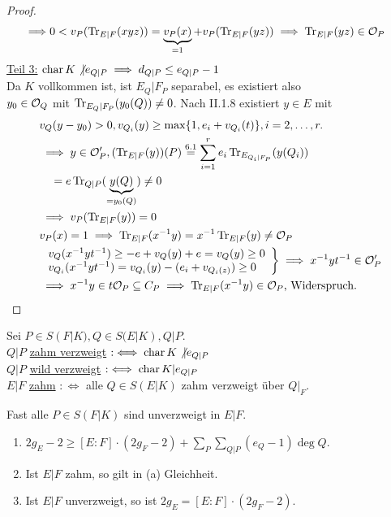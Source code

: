 \begin{proof}
\begin{align*}
        \implies & 0 < v_P(\operatorname{Tr}_{E|F}(xyz)) = \underbrace{v_P(x)}_{=1} + v_P(\operatorname{Tr}_{E|F}(yz)) \implies \operatorname{Tr}_{E|F}(yz) \in \mathcal{O}_P
    \end{align*}
    \underline{Teil 3:} $\operatorname{char} K \not | e_{Q|P} \implies d_{Q|P} \leq e_{Q|P} - 1$\\
    Da $K$ vollkommen ist, ist $E_Q|F_P$ separabel, es existiert also\\ $y_0 \in \mathcal{O}_Q$ mit $\operatorname{Tr}_{E_Q|F_P}(y_0(Q)) \ne 0$.
    Nach II.1.8 existiert $y \in E$ mit 
    \begin{align*}
        & v_Q(y-y_0) > 0, v_{Q_i}(y) \geq \max \{1, e_i+v_{Q_i}(t)\}, i=2,\ldots,r.\\
        & \implies y \in \mathcal{O}'_P, (\operatorname{Tr}_{E|F}(y))(P) \overset{6.1}{=} \sum_{i=1}^r e_i \operatorname{Tr}_{E_{Q_i|F_P}}(y(Q_i))\\
        & \quad = e \operatorname{Tr}_{Q|P}(\underbrace{y(Q)}_{=y_0(Q)}) \ne 0\\
        & \implies v_P(\operatorname{Tr}_{E|F}(y)) = 0\\
        & v_P(x) = 1 \implies \operatorname{Tr}_{E|F}(x^{-1}y) = x^{-1}\operatorname{Tr}_{E|F}(y) \ne \mathcal{O}_P\\
        & \left. \begin{array}{l}
            v_Q(x^{-1}yt^{-1}) \geq -e + v_Q(y) +e = v_Q(y) \geq 0\\
            v_{Q_i}(x^{-1}yt^{-1}) = v_{Q_i}(y) - (e_i + v_{Q_i(z)}) \geq 0
        \end{array} \right\} \implies x^{-1}yt^{-1}\in \mathcal{O}'_P\\
        & \implies x^{-1}y \in t \mathcal{O}_P \subseteq C_P \implies \operatorname{Tr}_{E|F}(x^{-1}y)\in \mathcal{O}_P \text{, Widerspruch.}
    \end{align*}
\end{proof}

\begin{definition}
    Sei $P \in S(F|K), Q \in S(E|K), Q|P$.\\
    $Q|P$ \underline{zahm verzweigt} $:\iff \operatorname{char} K \not | e_{Q|P}$\\
    $Q|P$ \underline{wild verzweigt} $:\iff \operatorname{char} K | e_{Q|P}$\\
    $E|F$ \underline{zahm} $:\iff$ alle $Q \in S(E|K)$ zahm verzweigt über $Q|_F$.
\end{definition}

\begin{korollar}
    Fast alle $P \in S(F|K)$ sind unverzweigt in $E|F$.    
\end{korollar}

\begin{korollar}
    \begin{enumerate}[label=(\alph*)]
        \item $2 g_E - 2 \geq [E:F] \cdot (2 g_F -2)+\sum\limits_P\sum\limits_{Q|P}(e_Q - 1) \deg Q$.
        \item Ist $E|F$ zahm, so gilt in (a) Gleichheit.
        \item Ist $E|F$ unverzweigt, so ist $2g_E = [E:F] \cdot (2g_F-2)$.
    \end{enumerate}
\end{korollar}

